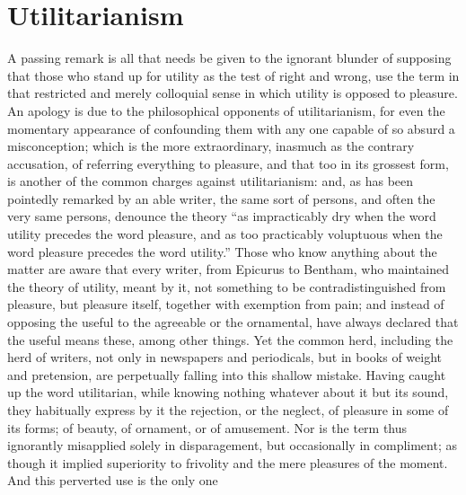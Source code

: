 
\author{John Stuart Mill}
\chapter[Utilitarianism, chap. 2]{Utilitarianism}


A passing remark is all that needs be given to the ignorant
blunder of supposing that those who stand up for utility as the test
of right and wrong, use the term in that restricted and merely
colloquial sense in which utility is opposed to pleasure. An apology
is due to the philosophical opponents of utilitarianism, for even the
momentary appearance of confounding them with any one capable of so
absurd a misconception; which is the more extraordinary, inasmuch as
the contrary accusation, of referring everything to pleasure, and that
too in its grossest form, is another of the common charges against
utilitarianism: and, as has been pointedly remarked by an able writer,
the same sort of persons, and often the very same persons, denounce
the theory ``as impracticably dry when the word utility precedes the
word pleasure, and as too practicably voluptuous when the word
pleasure precedes the word utility.'' Those who know anything about
the matter are aware that every writer, from Epicurus to Bentham, who
maintained the theory of utility, meant by it, not something to be
contradistinguished from pleasure, but pleasure itself, together with
exemption from pain; and instead of opposing the useful to the
agreeable or the ornamental, have always declared that the useful
 means these, among other things. Yet the common herd,
including the herd of writers, not only in newspapers and periodicals,
but in books of weight and pretension, are perpetually falling into
this shallow mistake. Having caught up the word utilitarian, while
knowing nothing whatever about it but its sound, they habitually
express by it the rejection, or the neglect, of pleasure in some of
its forms; of beauty, of ornament, or of amusement. Nor is the term
thus ignorantly misapplied solely in disparagement, but occasionally
in compliment; as though it implied superiority to frivolity and the
mere pleasures of the moment. And this perverted use is the only one
